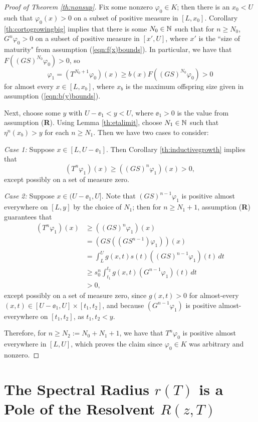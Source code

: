 \begin{proof}[Proof of Theorem \ref{th:nonsup}]
	Fix some nonzero $\varphi_0 \in K$; then there is an $x_0<U$ such that $\varphi_0(x)>0$ on a subset of positive measure in $[L, x_0]$. Corollary \ref{th:cortogrowingbig} implies that there is some $N_0 \in \mathbb{N}$ such that for $n \geq N_0$, $G^n\varphi_0>0$ on a subset of positive measure in $[x', U]$, where $x'$ is the ``size of maturity" from assumption (\ref{eqn:f(x)bounds}). In particular, we have that $F((GS)^{N_0} \varphi_0) > 0$, so 
	\[\varphi_1 = (T^{N_0 + 1} \varphi_0)(x) \geq b(x) F((GS)^{N_0} \varphi_0) > 0\]
	for almost every $x \in [L, x_b]$, where $x_b$ is the maximum offspring size given in assumption (\ref{eqn:b(y)bounds}).
	
	Next, choose some $y$ with $U - \ee_1 < y < U$, where $\ee_1 > 0$ is the value from assumption (\textbf{R}). Using Lemma \ref{th:etalimit}, choose $N_1 \in \mathbb{N}$ such that $\eta^n(x_b) > y$ for each $n \geq N_1$. Then we have two cases to consider:
	
	\emph{Case 1:} Suppose $x \in [L, U-\ee_1]$. Then Corollary \ref{th:inductivegrowth} implies that
	\[(T^n \varphi_1)(x) \geq ((GS)^n \varphi_1)(x) > 0,\]
	except possibly on a set of measure zero.
	
	\emph{Case 2:} Suppose $x \in (U - \ee_1, U]$. Note that $(GS)^{n - 1}\varphi_1$ is positive almost everywhere on $[L, y]$ by the choice of $N_1$; then for $n \geq N_1 + 1$, assumption (\textbf{R}) guarantees that
	\begin{align*}
		(T^n \varphi_1)(x) &\geq ((GS)^n \varphi_1)(x) \\
		&= (GS((GS^{n-1})\varphi_1))(x) \\
		&= \int_L^U g(x, t) s(t) ((GS)^{n-1}\varphi_1)(t) \, dt \\
		&\geq s_0^n \int_{t_1}^{t_2} g(x, t) (G^{n-1}\varphi_1)(t) \, dt \\
		&> 0,
	\end{align*}
	except possibly on a set of measure zero, since $g(x, t) > 0$ for almost-every $(x, t) \in [U- \ee_1, U] \times [t_1, t_2]$, and because $(G^{n - 1}\varphi_1)$ is positive almost-everywhere on $[t_1, t_2]$, as $t_1, t_2 < y$.
	
	Therefore, for $n \geq N_2:= N_0 + N_1 + 1$, we have that $T^n \varphi_0$ is positive almost everywhere in $[L, U]$, which proves the claim since  $\varphi_0 \in K$ was arbitrary and nonzero. 
\end{proof}

\section{The Spectral Radius $r(T)$ is a Pole of the Resolvent $R(z, T)$} \label{section:pole}

